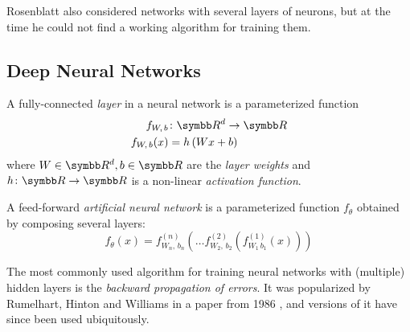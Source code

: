 Rosenblatt also considered networks with several layers of neurons, but at the time he could not find a working algorithm for training them.





\subsection{Deep Neural Networks}

\begin{definition}
A fully-connected \emph{layer} in a neural network is a  parameterized function
\begin{align*}
    f_{W, \, b} &\colon \reals^d \to \reals \\
    f_{W, \, b} (x) &= h\left(W x + b\right)
\end{align*}
where \(W \in \reals^d, b \in \reals\) are the \emph{layer weights} and \(h \colon \reals \to \reals\) is a non-linear \emph{activation function}.
\end{definition}

\begin{definition}
A feed-forward \emph{artificial neural network} is a parameterized function \(f_{\theta}\) obtained by composing several layers:
\[
    f_{\theta} (x) = f^{(n)}_{W_n, \, b_n} \left(\dots f^{(2)}_{W_2, \, b_2} (f^{(1)}_{W_1 \, b_1} (x))\right)
\]
\end{definition}


The most commonly used algorithm for training neural networks with (multiple) hidden layers is the \emph{backward propagation of errors}. It was popularized by Rumelhart, Hinton and Williams in a paper from 1986 \cite{Rumelhart1986}, and versions of it have since been used ubiquitously.

